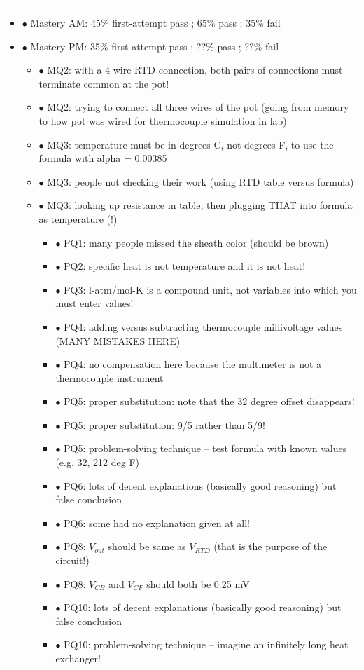 \begin{itemize}
\begin{itemize}
\begin{itemize}
\begin{itemize}
\filbreak \vskip 5pt \hrule \vskip 5pt  \vskip 10pt

\begin{itemize}
\item{$\bullet$} Mastery AM: 45\% first-attempt pass ; 65\% pass ; 35\% fail
\item{$\bullet$} Mastery PM: 35\% first-attempt pass ; ??\% pass ; ??\% fail
\begin{itemize}
\item{$\bullet$} MQ2: with a 4-wire RTD connection, both pairs of connections must terminate common at the pot! 
\item{$\bullet$} MQ2: trying to connect all three wires of the pot (going from memory to how pot was wired for thermocouple simulation in lab)
\item{$\bullet$} MQ3: temperature must be in degrees C, not degrees F, to use the formula with alpha = 0.00385
\item{$\bullet$} MQ3: people not checking their work (using RTD table versus formula)
\item{$\bullet$} MQ3: looking up resistance in table, then plugging THAT into formula as temperature (!)
\begin{itemize}
\item{$\bullet$} PQ1: many people missed the sheath color (should be brown)
\item{$\bullet$} PQ2: specific heat is not temperature and it is not heat! 
\item{$\bullet$} PQ3: l-atm/mol-K is a compound unit, not variables into which you must enter values!
\item{$\bullet$} PQ4: adding versus subtracting thermocouple millivoltage values (MANY MISTAKES HERE)
\item{$\bullet$} PQ4: no compensation here because the multimeter is not a thermocouple instrument
\item{$\bullet$} PQ5: proper substitution: note that the 32 degree offset disappears!
\item{$\bullet$} PQ5: proper substitution: 9/5 rather than 5/9!
\item{$\bullet$} PQ5: problem-solving technique -- test formula with known values (e.g. 32, 212 deg F)
\item{$\bullet$} PQ6: lots of decent explanations (basically good reasoning) but false conclusion
\item{$\bullet$} PQ6: some had no explanation given at all!
\item{$\bullet$} PQ8: $V_{out}$ should be same as $V_{RTD}$ (that is the purpose of the circuit!)
\item{$\bullet$} PQ8: $V_{CB}$ and $V_{CF}$ should both be 0.25 mV
\item{$\bullet$} PQ10: lots of decent explanations (basically good reasoning) but false conclusion
\item{$\bullet$} PQ10: problem-solving technique -- imagine an infinitely long heat exchanger!
\medskip



\end{itemize}
\end{itemize}
\end{itemize}
\end{itemize}
\end{itemize}
\end{itemize}
\end{itemize}
